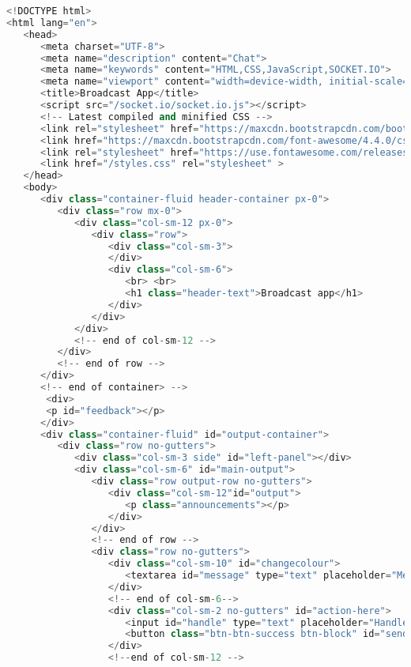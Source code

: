 \documentclass{fisatproject}
\begin{document}
\begin{appendices}
\begin{lstlisting}[language=c++]
<!DOCTYPE html>
<html lang="en">
   <head>
      <meta charset="UTF-8">
      <meta name="description" content="Chat">
      <meta name="keywords" content="HTML,CSS,JavaScript,SOCKET.IO">
      <meta name="viewport" content="width=device-width, initial-scale=1.0">
      <title>Broadcast App</title>
      <script src="/socket.io/socket.io.js"></script>
      <!-- Latest compiled and minified CSS -->
      <link rel="stylesheet" href="https://maxcdn.bootstrapcdn.com/bootstrap/4.0.0/css/bootstrap.min.css" integrity="sha384-Gn5384xqQ1aoWXA+058RXPxPg6fy4IWvTNh0E263XmFcJlSAwiGgFAW/dAiS6JXm" crossorigin="anonymous">
      <link href="https://maxcdn.bootstrapcdn.com/font-awesome/4.4.0/css/font-awesome.min.css" rel="stylesheet">
      <link rel="stylesheet" href="https://use.fontawesome.com/releases/v5.8.1/css/all.css" integrity="sha384-50oBUHEmvpQ+1lW4y57PTFmhCaXp0ML5d60M1M7uH2+nqUivzIebhndOJK28anvf" crossorigin="anonymous">
      <link href="/styles.css" rel="stylesheet" >
   </head>
   <body>
      <div class="container-fluid header-container px-0">
         <div class="row mx-0">
            <div class="col-sm-12 px-0">
               <div class="row">
                  <div class="col-sm-3">
                  </div>
                  <div class="col-sm-6">
                     <br> <br>
                     <h1 class="header-text">Broadcast app</h1>
                  </div>
               </div>
            </div>
            <!-- end of col-sm-12 -->
         </div>
         <!-- end of row -->
      </div>
      <!-- end of container> -->
       <div>
       <p id="feedback"></p>
      </div>
      <div class="container-fluid" id="output-container">
         <div class="row no-gutters">
            <div class="col-sm-3 side" id="left-panel"></div>
            <div class="col-sm-6" id="main-output">
               <div class="row output-row no-gutters">
                  <div class="col-sm-12"id="output">
                     <p class="announcements"></p>
                  </div>
               </div>
               <!-- end of row -->
               <div class="row no-gutters">
                  <div class="col-sm-10" id="changecolour">
                     <textarea id="message" type="text" placeholder="Message"></textarea>
                  </div>
                  <!-- end of col-sm-6-->
                  <div class="col-sm-2 no-gutters" id="action-here">
                     <input id="handle" type="text" placeholder="Handle" />
                     <button class="btn-btn-success btn-block" id="send">Send</button>
                  </div>
                  <!--end of col-sm-12 -->

\end{lstlisting}
\end{appendices}
\end{document}

